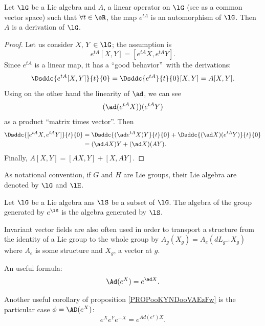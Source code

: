 \begin{lemma}
	Let $\lG$ be a Lie algebra and $A$, a linear operator on $\lG$ (see as a common vector space) such that $\forall t\in\eR$, the map $e^{tA}$ is an automorphism of $\lG$. Then $A$ is a derivation of $\lG$.
	\label{lem:autom_derr}
\end{lemma}

\begin{proof}
	Let us consider $X$, $Y\in\lG$;  the assumption is
	\[
		e^{tA}[X,Y]=[e^{tA}X,e^{tA}Y].
	\]
	Since $e^{tA}$ is a linear map, it has a ``good behavior''\ with the derivations:
	\[
		\Dsddc{e^{tA}[X,Y]}{t}{0}=\Dsddc{e^{tA}}{t}{0}[X,Y]=A[X,Y].
	\]
	Using on the other hand the linearity of $\ad$, we can see
	\[
		(\ad(e^{tA}X))(e^{tA}Y)
	\]
	as a product ``matrix times vector''. Then
	\begin{equation}
		\begin{split}
			\Dsddc{[e^{tA}X,e^{tA}Y]}{t}{0} & =\Dsddc{(\ad e^{tA}X)Y}{t}{0}+\Dsddc{(\ad X)(e^{tA}Y)}{t}{0} \\
			                                & =(\ad AX)Y+(\ad X)(AY).
		\end{split}
	\end{equation}
	Finally, $A[X,Y]=[AX,Y]+[X,AY]$.

\end{proof}

As notational convention, if $G$ and $H$ are Lie groups, their Lie algebra are denoted by $\lG$ and $\lH$.

\begin{lemma}		\label{LemAlgEtGroupesGenere}
	Let $\lG$ be a Lie algebra ans $\lS$ be a subset of $\lG$. The algebra of the group generated by $ e^{\lS}$ is the algebra generated by $\lS$.
\end{lemma}

Invariant vector fields are also often used in order to transport a structure from the identity of a Lie group to the whole group by $A_g(X_g)=A_e(dL_{g^{-1}}X_g)$ where $A_e$ is some structure and $X_g$, a vector at $g$.


\begin{corollary}\label{Ad_e}
	An useful formula:
	\[
		\Ad(e^X)=e^{\ad X}.
	\]
\end{corollary}

\begin{corollary}
	Another useful corollary of proposition \ref{PROPooKYNDooVAEzFw} is the particular case $\phi=\AD(e^X)$:
	\[
		e^Xe^Ye^{-X}=e^{Ad(e^Y)X}.
	\]
	\label{cor:eXeYe-X}
\end{corollary}

